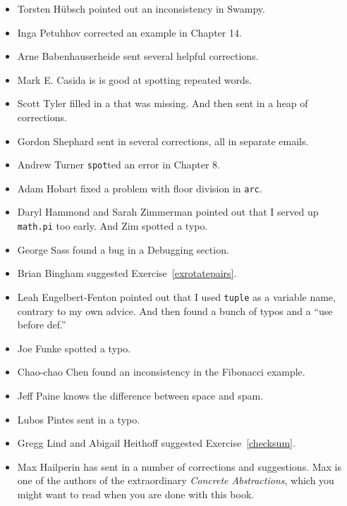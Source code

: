 \documentclass[10pt]{book}
\begin{document}
\begin{CJK}{UTF8}{gbsn}
\begin{itemize}
\item Torsten H\"{u}bsch pointed out an inconsistency in Swampy.

\item Inga Petuhhov corrected an example in Chapter 14.

\item Arne Babenhauserheide sent several helpful corrections.

\item Mark E. Casida is is good at spotting repeated words.

\item Scott Tyler filled in a that was missing.  And then sent in
a heap of corrections.

\item Gordon Shephard sent in several corrections, all in separate
emails.

\item Andrew Turner {\tt spot}ted an error in Chapter 8.

\item Adam Hobart fixed a problem with floor division in {\tt arc}.

\item Daryl Hammond and Sarah Zimmerman pointed out that I served
up {\tt math.pi} too early.  And Zim spotted a typo.

\item George Sass found a bug in a Debugging section.

\item Brian Bingham suggested Exercise~\ref{exrotatepairs}.

\item Leah Engelbert-Fenton pointed out that I used {\tt tuple}
as a variable name, contrary to my own advice.  And then found
a bunch of typos and a ``use before def.''

\item Joe Funke spotted a typo.

\item Chao-chao Chen found an inconsistency in the Fibonacci example.

\item Jeff Paine knows the difference between space and spam.

\item Lubos Pintes sent in a typo.

\item Gregg Lind and Abigail Heithoff suggested Exercise~\ref{checksum}.

\item Max Hailperin has sent in a number of corrections and
  suggestions.  Max is one of the authors of the extraordinary {\em
    Concrete Abstractions}, which you might want to read when you are
  done with this book.


\end{itemize}
\end{CJK}
\end{document}

